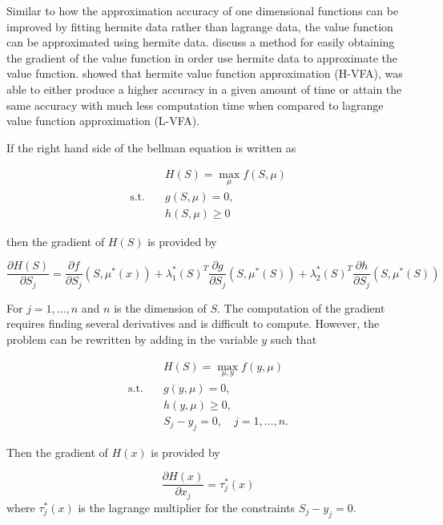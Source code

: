 \documentclass[12pt]{article}
\begin{document}
Similar to how the approximation accuracy of one dimensional functions can be improved by fitting hermite data rather than lagrange data, the value function can be approximated using hermite data. \citet{2015_Judd_Cai} discuss a method for easily obtaining the gradient of the value function in order use hermite data to approximate the value function. \citet{2015_Judd_Cai} showed that hermite value function approximation (H-VFA), was able to either produce a higher accuracy in a given amount of time or attain the same accuracy with much less computation time when compared to lagrange value function approximation (L-VFA).

If the right hand side of the bellman equation is written as

\begin{equation}
  \begin{aligned}
    & H(S)=\max_{\mu} f(S,\mu) \\
    \text{s.t.}\quad & g(S, \mu)=0,\\
    & h(S,\mu) \geq 0
  \end{aligned}
  \label{equationA}
\end{equation}

then the gradient of $H(S)$ is provided by

\begin{equation*}
  \frac{\partial H(S)}{\partial S_j} =\frac{\partial f}{\partial S_j}(S, \mu^*(x)) + \lambda_1^*(S)^T\frac{\partial g}{\partial S_j}(S, \mu^*(S)) + \lambda_2^*(S)^T\frac{\partial h}{\partial S_j}(S, \mu^*(S))
\end{equation*}

For $j=1,\dots,n$ and $n$ is the dimension of $S$. The computation of the gradient requires finding several derivatives and is difficult to compute. However, the problem can be rewritten by adding in the variable $y$ such that

\begin{equation}
  \begin{aligned}
    & H(S)=\max_{\mu,y} f(y,\mu) \\
    \text{s.t.}\quad & g(y, \mu)=0,\\
    & h(y,\mu) \geq 0,\\
    & S_j-y_j=0,\quad j=1,\dots,n.
  \end{aligned}
  \label{equationB}
\end{equation}

Then the gradient of $H(x)$ is provided by

\begin{equation*}
  \frac{\partial H(x)}{\partial x_j} = \tau^*_j(x)
\end{equation*}
where $\tau^*_j(x)$ is the lagrange multiplier for the constraints $S_j-y_j=0$.
\end{document}
